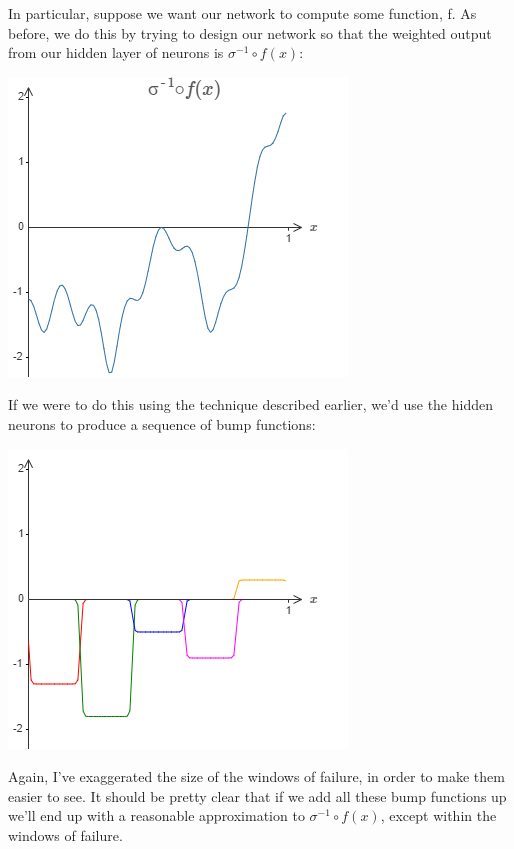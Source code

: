 \documentclass[a4paper,twoside,10pt]{book}
\begin{document}
In particular, suppose we want our network to compute some function, f. As before, we do this by trying to design our network so that the weighted output from our hidden layer of neurons is $\sigma^{-1}\circ f(x)$:
\begin{center}
	\includegraphics[width=0.6\linewidth]{figures/ch4/tikz454}
\end{center}
If we were to do this using the technique described earlier, we'd use the hidden neurons to produce a sequence of bump functions:
\begin{center}
	\includegraphics[width=0.4\linewidth]{figures/ch4/tikz455}
\end{center}
Again, I've exaggerated the size of the windows of failure, in order to make them easier to see. It should be pretty clear that if we add all these bump functions up we'll end up with a reasonable approximation to $\sigma^{-1}\circ f(x)$, except within the windows of failure.
\end{document}
